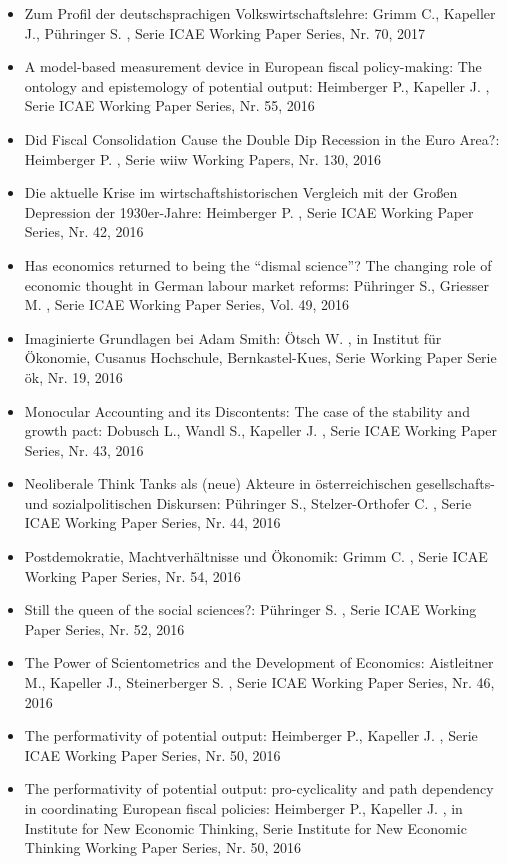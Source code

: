 \begin{itemize}
\item Zum Profil der deutschsprachigen Volkswirtschaftslehre: Grimm C., Kapeller J., Pühringer S. , Serie ICAE Working Paper Series, Nr. 70, 2017
\item A model-based measurement device in European fiscal policy-making: The ontology and epistemology of potential output: Heimberger P., Kapeller J. , Serie ICAE Working Paper Series, Nr. 55, 2016
\item Did Fiscal Consolidation Cause the Double Dip Recession in the Euro Area?: Heimberger P. , Serie wiiw Working Papers, Nr. 130, 2016
\item Die aktuelle Krise im wirtschaftshistorischen Vergleich mit der Großen Depression der 1930er-Jahre: Heimberger P. , Serie ICAE Working Paper Series, Nr. 42, 2016
\item Has economics returned to being the “dismal science”? The changing role of economic thought in German labour market reforms: Pühringer S., Griesser M. , Serie ICAE Working Paper Series, Vol. 49, 2016
\item Imaginierte Grundlagen bei Adam Smith: Ötsch W. , in Institut für Ökonomie, Cusanus Hochschule, Bernkastel-Kues, Serie Working Paper Serie ök, Nr. 19, 2016
\item Monocular Accounting and its Discontents: The case of the stability and growth pact: Dobusch L., Wandl S., Kapeller J. , Serie ICAE Working Paper Series, Nr. 43, 2016
\item Neoliberale Think Tanks als (neue) Akteure in österreichischen gesellschafts- und sozialpolitischen Diskursen: Pühringer S., Stelzer-Orthofer C. , Serie ICAE Working Paper Series, Nr. 44, 2016
\item Postdemokratie, Machtverhältnisse und Ökonomik: Grimm C. , Serie ICAE Working Paper Series, Nr. 54, 2016
\item Still the queen of the social sciences?: Pühringer S. , Serie ICAE Working Paper Series, Nr. 52, 2016
\item The Power of Scientometrics and the Development of Economics: Aistleitner M., Kapeller J., Steinerberger S. , Serie ICAE Working Paper Series, Nr. 46, 2016
\item The performativity of potential output: Heimberger P., Kapeller J. , Serie ICAE Working Paper Series, Nr. 50, 2016
\item The performativity of potential output: pro-cyclicality and path dependency in coordinating European fiscal policies: Heimberger P., Kapeller J. , in Institute for New Economic Thinking, Serie Institute for New Economic Thinking  Working Paper Series, Nr. 50, 2016

\end{itemize}
